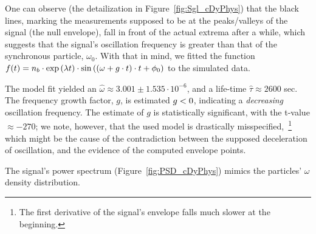 \documentclass{article}
\begin{document}
One can observe (the detailization in Figure~\ref{fig:Sgl_cDyPhys}) that the black lines, marking the measurements supposed to be at the peaks/valleys of the signal (the null envelope), fall in front of the actual extrema after a while, which suggests that the signal's oscillation frequency is greater than that of the synchronous particle, $\omega_0$. With that in mind, we fitted the function $f(t) = n_b\cdot\exp\bkt{\lambda t}\cdot\sin\bkt{(\omega+\dwcoef\cdot t)\cdot t + \phi_0}$ to the simulated data.

The model fit yielded an $\hat{\omega} \approx 3.001 \pm 1.535\cdot10^{-6}$, and a life-time $\hat{\tau}\approx 2600$ sec. The frequency growth factor, $g$, is estimated $g < 0$, indicating a \emph{decreasing} oscillation frequency. The estimate of $g$ is statistically significant, with the t-value $\approx -270$; we note, however, that the used model is drastically misspecified,~\footnote{The first derivative of the signal's envelope falls much slower at the beginning.} which might be the cause of the contradiction between the supposed deceleration of oscillation, and the evidence of the computed envelope points. 

The signal's power spectrum (Figure~\ref{fig:PSD_cDyPhys}) mimics the particles' $\omega$ density distribution.
\end{document}
